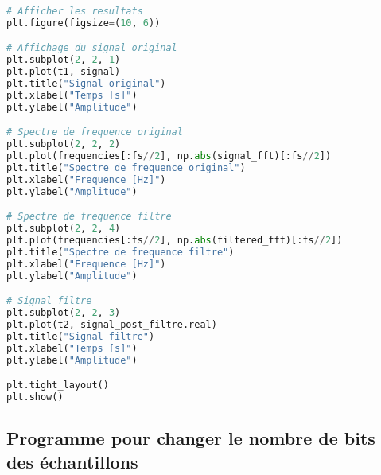 \documentclass[11pt,letterpaper]{article}
\begin{document}
\begin{lstlisting}[language=python]
# Afficher les resultats
plt.figure(figsize=(10, 6))

# Affichage du signal original
plt.subplot(2, 2, 1)
plt.plot(t1, signal)
plt.title("Signal original")
plt.xlabel("Temps [s]")
plt.ylabel("Amplitude")

# Spectre de frequence original
plt.subplot(2, 2, 2)
plt.plot(frequencies[:fs//2], np.abs(signal_fft)[:fs//2])
plt.title("Spectre de frequence original")
plt.xlabel("Frequence [Hz]")
plt.ylabel("Amplitude")

# Spectre de frequence filtre
plt.subplot(2, 2, 4)
plt.plot(frequencies[:fs//2], np.abs(filtered_fft)[:fs//2])
plt.title("Spectre de frequence filtre")
plt.xlabel("Frequence [Hz]")
plt.ylabel("Amplitude")

# Signal filtre
plt.subplot(2, 2, 3)
plt.plot(t2, signal_post_filtre.real)
plt.title("Signal filtre")
plt.xlabel("Temps [s]")
plt.ylabel("Amplitude")

plt.tight_layout()
plt.show()
\end{lstlisting}

\subsection{Programme pour changer le nombre de bits des échantillons}
\end{document}
